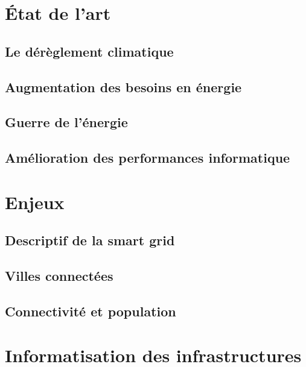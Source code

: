 \chapter{État de l’art}
\section{Le dérèglement climatique}
\section{Augmentation des besoins en énergie}
\section{Guerre de l'énergie}
\section{Amélioration des performances informatique}

\chapter{Enjeux}
\section{Descriptif de la smart grid}




\section{Villes connectées}

\section{Connectivité et population}





\chapter{Informatisation des infrastructures}
